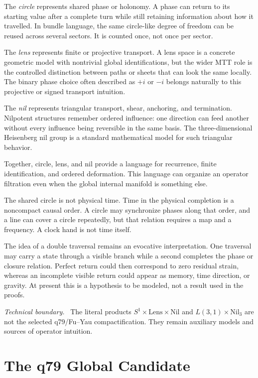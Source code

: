 \documentclass[11pt,openany]{book}
\newenvironment{technicalboundary}
  {\par\small\noindent\textit{Technical boundary.}\ }
  {\par}
\begin{document}
The \emph{circle} represents shared phase or holonomy. A phase can return to
its starting value after a complete turn while still retaining information
about how it travelled. In bundle language, the same circle-like degree of
freedom can be reused across several sectors. It is counted once, not once
per sector.

The \emph{lens} represents finite or projective transport. A lens space is a
concrete geometric model with nontrivial global identifications, but the wider
MTT role is the controlled distinction between paths or sheets that can look
the same locally. The binary phase choice often described as $+i$ or $-i$
belongs naturally to this projective or signed transport intuition.

The \emph{nil} represents triangular transport, shear, anchoring, and
termination. Nilpotent structures remember ordered influence: one direction
can feed another without every influence being reversible in the same basis.
The three-dimensional Heisenberg nil group is a standard mathematical model
for such triangular behavior.

Together, circle, lens, and nil provide a language for recurrence, finite
identification, and ordered deformation. This language can organize an
operator filtration even when the global internal manifold is something
else.

The shared circle is not physical time. Time in the physical completion is a
noncompact causal order. A circle may synchronize phases along that order,
and a line can cover a circle repeatedly, but that relation requires a map
and a frequency. A clock hand is not time itself.

The idea of a double traversal remains an evocative interpretation. One
traversal may carry a state through a visible branch while a second completes
the phase or closure relation. Perfect return could then correspond to zero
residual strain, whereas an incomplete visible return could appear as memory,
time direction, or gravity. At present this is a hypothesis to be modeled,
not a result used in the proofs.

\begin{technicalboundary}
The literal products $S^1\times\mathrm{Lens}\times\mathrm{Nil}$ and
$L(3,1)\times\mathrm{Nil}_3$ are not the selected q79/Fu--Yau
compactification. They remain auxiliary models and sources of operator
intuition.
\end{technicalboundary}

\chapter{The q79 Global Candidate}
\end{document}
